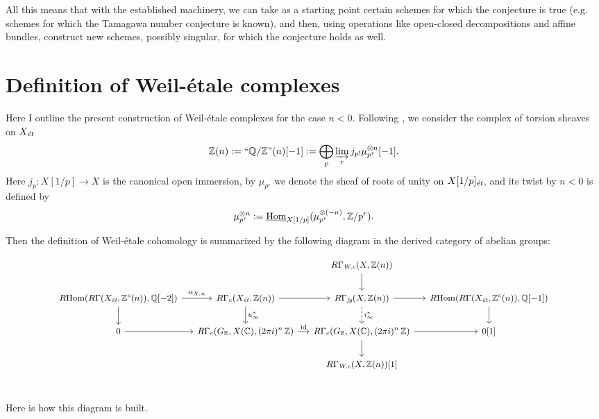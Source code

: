 \documentclass{article}
\theoremstyle{plain}
\begin{document}
\begin{center}
  \noindent *\quad *\quad *
\end{center}

All this means that with the established machinery, we can take as a starting
point certain schemes for which the conjecture is true (e.g. schemes for which
the Tamagawa number conjecture is known), and then, using operations like
open-closed decompositions and affine bundles, construct new schemes, possibly
singular, for which the conjecture holds as well.


\appendix
\section{Definition of Weil-étale complexes}

Here I outline the present construction of Weil-étale complexes for the case
$n < 0$. Following \cite{Flach-Morin-16}, we consider the complex of torsion
sheaves on $X_\text{\it ét}$
\[ \mathbb{Z} (n) \mathrel{\mathop:}= \text{``}\mathbb{Q}/\mathbb{Z}\text{''} (n) [-1] \mathrel{\mathop:}=
  \bigoplus_p \varinjlim_r  j_{p!} \mu_{p^r}^{\otimes n} [-1]. \]
Here $j_p\colon X [1/p] \to X$ is the canonical open immersion, by $\mu_{p^r}$
we denote the sheaf of roots of unity on $X [1/p]_\text{\it ét}$, and its twist
by $n < 0$ is defined by
$$\mu_{p^r}^{\otimes n} \mathrel{\mathop:}= \underline{\operatorname{Hom}}_{X[1/p]} (\mu_{p^r}^{\otimes (-n)}, \mathbb{Z}/p^r).$$

Then the definition of Weil-étale cohomology is summarized by the following
diagram in the derived category of abelian groups:

\[ \begin{tikzcd}[column sep=small, font=\small]
    & & R\Gamma_\text{\it W,c} (X, \ZZ (n))\ar{d} \\
    \RHom (R\Gamma (X_\text{\it ét}, \ZZ^c (n)), \QQ [-2]) \ar{r}{\alpha_{X,n}}\ar{d} & R\Gamma_c (X_\text{\it ét}, \ZZ (n)) \ar{r}\ar{d}{u_\infty^*} & R\Gamma_\text{\it fg} (X, \ZZ (n)) \ar{r}\ar[dashed]{d}{i_\infty^*} & \RHom (R\Gamma (X_\text{\it ét}, \ZZ^c (n)), \QQ [-1])\ar{d} \\
    0\ar{r} & R\Gamma_c (G_\RR, X (\CC), (2\pi i)^n\,\ZZ) \ar{r}{\idid} & R\Gamma_c (G_\RR, X (\CC), (2\pi i)^n\,\ZZ)\ar{d}\ar{r} & 0 [1] \\
    & & R\Gamma_\text{\it W,c} (X, \ZZ (n)) [1] \\
  \end{tikzcd} \]

Here is how this diagram is built.
\end{document}
